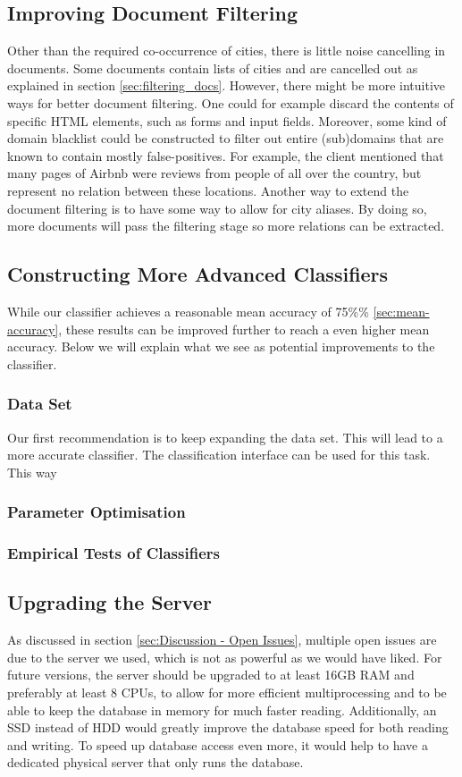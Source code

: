 \subsection{Improving Document Filtering}
Other than the required co-occurrence of cities, there is little noise cancelling in documents. Some documents contain lists of cities and are cancelled out as explained in section \ref{sec:filtering_docs}. However, there might be more intuitive ways for better document filtering. One could for example discard the contents of specific HTML elements, such as forms and input fields. Moreover, some kind of domain blacklist could be constructed to filter out entire (sub)domains that are known to contain mostly false-positives. For example, the client mentioned that many pages of Airbnb were reviews from people of all over the country, but represent no relation between these locations. Another way to extend the document filtering is to have some way to allow for city aliases. By doing so, more documents will pass the filtering stage so more relations can be extracted.

\subsection{Constructing More Advanced Classifiers}
While our classifier achieves a reasonable mean accuracy of 75\%\% \ref{sec:mean-accuracy}, these results can be improved further to reach a even higher mean accuracy. Below we will explain what we see as potential improvements to the classifier.

\subsubsection{Data Set}
Our first recommendation is to keep expanding the data set. This will lead to a more accurate classifier. The classification interface can be used for this task. This way 
\subsubsection{Parameter Optimisation}
\subsubsection{Empirical Tests of Classifiers}

\subsection{Upgrading the Server}
As discussed in section \ref{sec:Discussion - Open Issues}, multiple open issues are due to the server we used, which is not as powerful as we would have liked. For future versions, the server should be upgraded to at least 16GB RAM and preferably at least 8 CPUs, to allow for more efficient multiprocessing and to be able to keep the database in memory for much faster reading. Additionally, an SSD instead of HDD would greatly improve the database speed for both reading and writing. To speed up database access even more, it would help to have a dedicated physical server that only runs the database.

